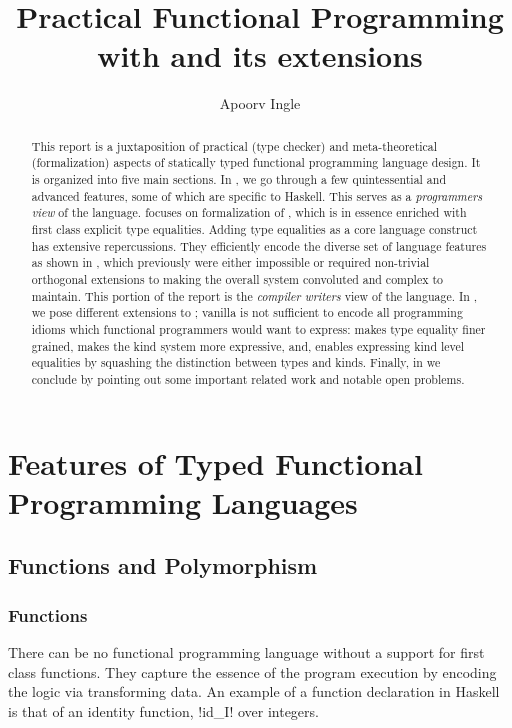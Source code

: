 \documentclass[manuscript,screen,nonacm]{acmart}
\title{Practical Functional Programming with \SFC and its extensions}
\author{Apoorv Ingle}
\affiliation{%
  \institution{University of Iowa} \department{Department of Computer Science} \streetaddress{McLean Hall} \city{Iowa City} \state{Iowa} \country{USA}}
\begin{document}
\begin{abstract}
This report is a juxtaposition of practical (type checker) and meta-theoretical (formalization) aspects of statically typed functional programming language design. It is organized into five main sections. In , we go through a few quintessential and advanced features, some of which are specific to Haskell. This serves as a \emph{programmers view} of the language.  focuses on formalization of \SFC, which is in essence \SF enriched with first class explicit type equalities. Adding type equalities as a core language construct has extensive repercussions. They efficiently encode the diverse set of language features as shown in , which previously were either impossible or required non-trivial orthogonal extensions to \SF making the overall system convoluted and complex to maintain. This portion of the report is the \emph{compiler writers} view of the language. In , we pose different extensions to \SFC; vanilla \SFC is not sufficient to encode all programming idioms which functional programmers would want to express: \SFR makes type equality finer grained, \SFP makes the kind system more expressive, and, \SFK enables expressing kind level equalities by squashing the distinction between types and kinds. Finally, in  we conclude by pointing out some important related work and notable open problems.
\end{abstract}

\maketitle
\section{Features of Typed Functional Programming Languages}\label{sec:language-features}%
\subsection{Functions and Polymorphism}
\subsubsection{Functions}
There can be no functional programming language without a support for first class functions. They capture the essence of the program execution by encoding the logic via transforming data. An example of a function declaration in Haskell is that of an identity function, !id_I! over integers.
\end{document}
